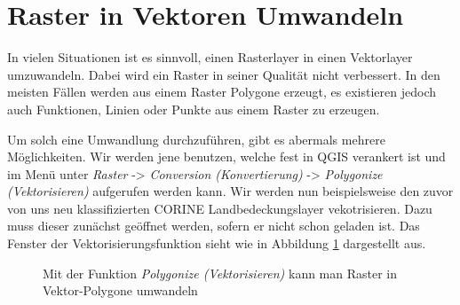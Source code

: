 \documentclass[a4paper,12pt,ngerman]{sphinxmanual}
\begin{document}
\section{Raster in Vektoren Umwandeln}
\label{uebung4:raster-in-vektoren-umwandeln}
In vielen Situationen ist es sinnvoll, einen Rasterlayer in einen Vektorlayer umzuwandeln. Dabei wird ein Raster in seiner Qualität nicht verbessert. In den meisten Fällen werden aus einem Raster Polygone erzeugt, es existieren jedoch auch Funktionen, Linien oder Punkte aus einem Raster zu erzeugen.

Um solch eine Umwandlung durchzuführen, gibt es abermals mehrere Möglichkeiten. Wir werden jene benutzen, welche fest in QGIS verankert ist und im Menü unter \emph{Raster} -\textgreater{} \emph{Conversion (Konvertierung)} -\textgreater{} \emph{Polygonize (Vektorisieren)} aufgerufen werden kann. Wir werden nun beispielsweise den zuvor von uns neu klassifizierten CORINE Landbedeckungslayer vekotrisieren. Dazu muss dieser zunächst geöffnet werden, sofern er nicht schon geladen ist. Das Fenster der Vektorisierungsfunktion sieht wie in Abbildung \hyperref[uebung4:figvectorize]{ \ref*{uebung4:figvectorize}} dargestellt aus.
\begin{figure}[htbp]
\centering
\capstart

\caption{Mit der Funktion \emph{Polygonize (Vektorisieren)} kann man Raster in Vektor-Polygone umwandeln}\label{uebung4:figvectorize}\end{figure}
\end{document}
